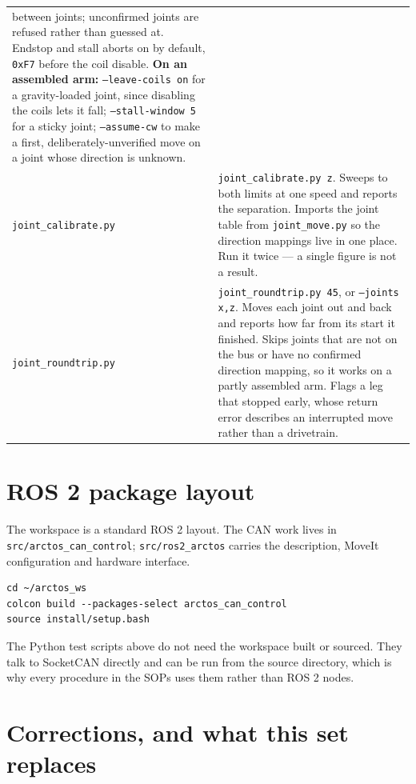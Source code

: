 \documentclass[11pt,letterpaper]{article}
\begin{document}
\begin{longtable}{p{}p{}}
  between joints; unconfirmed joints are refused rather than guessed at. Endstop
  and stall aborts on by default, \texttt{0xF7} before the coil disable.
  \textbf{On an assembled arm:} \texttt{--leave-coils on} for a gravity-loaded
  joint, since disabling the coils lets it fall; \texttt{--stall-window 5} for a
  sticky joint; \texttt{--assume-cw} to make a first, deliberately-unverified move
  on a joint whose direction is unknown. \\
\texttt{joint\_calibrate.py} &
  \texttt{joint\_calibrate.py z}. Sweeps to both limits at one speed and reports
  the separation. Imports the joint table from \texttt{joint\_move.py} so the
  direction mappings live in one place. Run it twice --- a single figure is not
  a result. \\
\texttt{joint\_roundtrip.py} &
  \texttt{joint\_roundtrip.py 45}, or \texttt{--joints x,z}. Moves each joint out
  and back and reports how far from its start it finished. Skips joints that are
  not on the bus or have no confirmed direction mapping, so it works on a partly
  assembled arm. Flags a leg that stopped early, whose return error describes an
  interrupted move rather than a drivetrain. \\
\bottomrule
\end{longtable}

\section{ROS 2 package layout}

The workspace is a standard ROS 2 layout. The CAN work lives in
\texttt{src/arctos\_can\_control}; \texttt{src/ros2\_arctos} carries the description,
MoveIt configuration and hardware interface.

\begin{lstlisting}
cd ~/arctos_ws
colcon build --packages-select arctos_can_control
source install/setup.bash
\end{lstlisting}

The Python test scripts above do not need the workspace built or sourced. They talk
to SocketCAN directly and can be run from the source directory, which is why every
procedure in the SOPs uses them rather than ROS 2 nodes.

\section{Corrections, and what this set replaces}
\label{sec:corrections}
\end{document}
